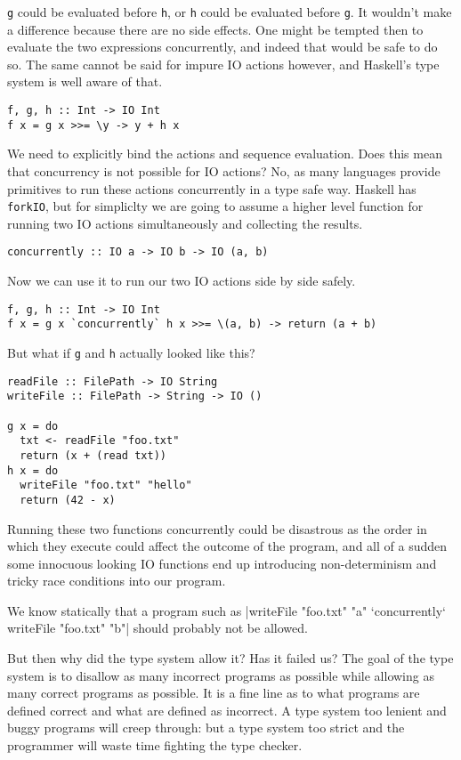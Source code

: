 \documentclass{report}
\begin{document}
\texttt{g} could be evaluated before \texttt{h}, or \texttt{h} could be
evaluated before \texttt{g}. It wouldn't make a difference because there are no
side effects. One might be tempted then to evaluate the two expressions
concurrently, and indeed that would be safe to do so.  The same cannot be said
for impure IO actions however, and Haskell's type system is well aware of that.
\begin{verbatim}
f, g, h :: Int -> IO Int
f x = g x >>= \y -> y + h x
\end{verbatim}
We need to explicitly bind the actions and sequence evaluation.
Does this mean that concurrency is not possible for IO actions? No, as many
languages provide primitives to run these actions concurrently in a type safe
way. Haskell has \texttt{forkIO}, but for simpliclty we are going
to assume a higher level function for running two IO actions simultaneously and
collecting the results.

\begin{verbatim}
concurrently :: IO a -> IO b -> IO (a, b)
\end{verbatim}

Now we can use it to run our two IO actions side by side safely. 
\begin{verbatim}
f, g, h :: Int -> IO Int
f x = g x `concurrently` h x >>= \(a, b) -> return (a + b)
\end{verbatim}

But what if \texttt{g} and \texttt{h} actually looked like this?

\begin{verbatim}
readFile :: FilePath -> IO String
writeFile :: FilePath -> String -> IO ()

g x = do
  txt <- readFile "foo.txt"
  return (x + (read txt))
h x = do
  writeFile "foo.txt" "hello"
  return (42 - x)
\end{verbatim}

Running these two functions concurrently could be disastrous as the order in
which they execute could affect the outcome of the program, and all of a sudden
some innocuous looking IO functions end up introducing non-determinism and
tricky race conditions into our program.

\begin{samepage}
We know statically that a program such as
|writeFile "foo.txt" "a" `concurrently` writeFile "foo.txt" "b"|
should probably not be allowed.
\end{samepage}
But then why did the type system allow it?  Has it failed us? The goal of the
type system is to disallow as many incorrect programs as possible while allowing
as many correct programs as possible. It is a fine line as to what programs are
defined correct and what are defined as incorrect. A type system too lenient and
buggy programs will creep through: but a type system too strict and the
programmer will waste time fighting the type checker.
\end{document}
